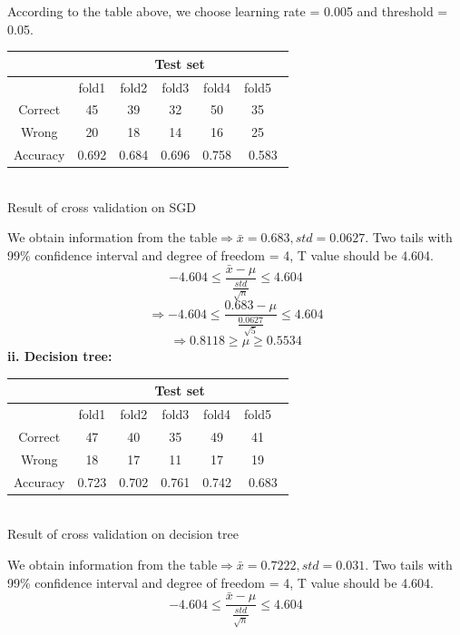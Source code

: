 According to the table above, we choose learning rate = 0.005 and threshold = 0.05.
\begin{center}
\begin{tabular}{|c|c|c|c|c|c|}
\hline
&\multicolumn{5}{|c|}{Test set}  \\ \hline
 & fold1 & fold2 & fold3& fold4 & fold5 \ \\ \hline
Correct & 45 & 39 & 32& 50 & 35 \ \\ \hline
Wrong & 20 & 18 & 14& 16 & 25 \ \\ \hline
Accuracy & 0.692 & 0.684 &0.696 & 0.758 & 0.583 \\ \hline
\end{tabular}\\
Result of cross validation on SGD
\end{center}
We obtain information from the table$\Rightarrow \bar{x} = 0.683, std = 0.0627$. Two tails with 99\% confidence interval and degree of freedom = 4, T value should be 4.604.
\begin{equation*}
	-4.604\leq \frac{\bar{x} - \mu }{\frac{std}{\sqrt{n}}} \leq 4.604 
\end{equation*}
\begin{equation*}
	\Rightarrow  -4.604\leq \frac{0.683 - \mu }{\frac{0.0627}{\sqrt{5}}} \leq 4.604 
\end{equation*}
\begin{equation*}
	\Rightarrow  0.8118 \ge  {\mu } \ge  0.5534
\end{equation*}
\clearpage
\textbf{ii. Decision tree:}
\begin{center}
\begin{tabular}{|c|c|c|c|c|c|}
\hline
&\multicolumn{5}{|c|}{Test set}  \\ \hline
 & fold1 & fold2 & fold3& fold4 & fold5 \ \\ \hline
Correct & 47 & 40 & 35& 49 & 41 \ \\ \hline
Wrong & 18 & 17 & 11& 17 & 19 \ \\ \hline
Accuracy & 0.723 & 0.702 &0.761 & 0.742 & 0.683 \\ \hline
\end{tabular}\\
Result of cross validation on decision tree
\end{center}
We obtain information from the table$\Rightarrow \bar{x} = 0.7222, std = 0.031$. Two tails with 99\% confidence interval and degree of freedom = 4, T value should be 4.604.
\begin{equation*}
	-4.604\leq \frac{\bar{x} - \mu }{\frac{std}{\sqrt{n}}} \leq 4.604 
\end{equation*}
